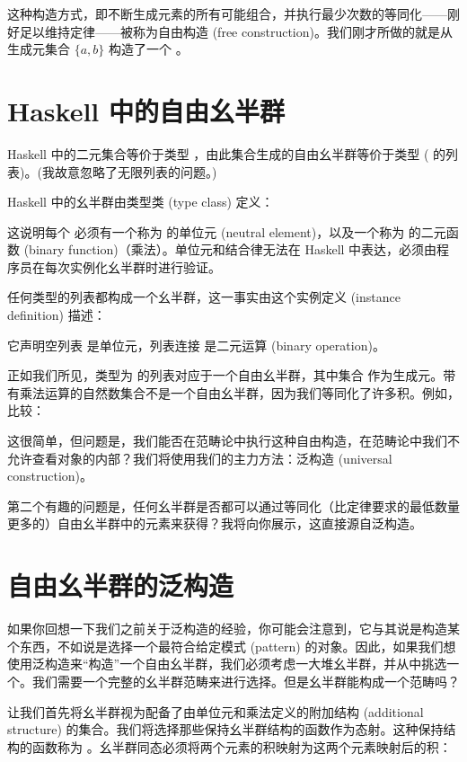 这种构造方式，即不断生成元素的所有可能组合，并执行最少次数的等同化——刚好足以维持定律——被称为自由构造 (free construction)。我们刚才所做的就是从生成元集合 $\{a, b\}$ 构造了一个 。

\section{Haskell 中的自由幺半群}

Haskell 中的二元集合等价于类型 ，由此集合生成的自由幺半群等价于类型 \code{{[}Bool{]}} ( 的列表)。(我故意忽略了无限列表的问题。)

Haskell 中的幺半群由类型类 (type class) 定义：

这说明每个  必须有一个称为  的单位元 (neutral element)，以及一个称为  的二元函数 (binary function)（乘法）。单位元和结合律无法在 Haskell 中表达，必须由程序员在每次实例化幺半群时进行验证。

任何类型的列表都构成一个幺半群，这一事实由这个实例定义 (instance definition) 描述：

它声明空列表 \code{{[}{]}} 是单位元，列表连接 \code{(++)} 是二元运算 (binary operation)。

正如我们所见，类型为  的列表对应于一个自由幺半群，其中集合  作为生成元。带有乘法运算的自然数集合不是一个自由幺半群，因为我们等同化了许多积。例如，比较：

这很简单，但问题是，我们能否在范畴论中执行这种自由构造，在范畴论中我们不允许查看对象的内部？我们将使用我们的主力方法：泛构造 (universal construction)。

第二个有趣的问题是，任何幺半群是否都可以通过等同化（比定律要求的最低数量更多的）自由幺半群中的元素来获得？我将向你展示，这直接源自泛构造。

\section{自由幺半群的泛构造}

如果你回想一下我们之前关于泛构造的经验，你可能会注意到，它与其说是构造某个东西，不如说是选择一个最符合给定模式 (pattern) 的对象。因此，如果我们想使用泛构造来“构造”一个自由幺半群，我们必须考虑一大堆幺半群，并从中挑选一个。我们需要一个完整的幺半群范畴来进行选择。但是幺半群能构成一个范畴吗？

让我们首先将幺半群视为配备了由单位元和乘法定义的附加结构 (additional structure) 的集合。我们将选择那些保持幺半群结构的函数作为态射。这种保持结构的函数称为 。幺半群同态必须将两个元素的积映射为这两个元素映射后的积：

